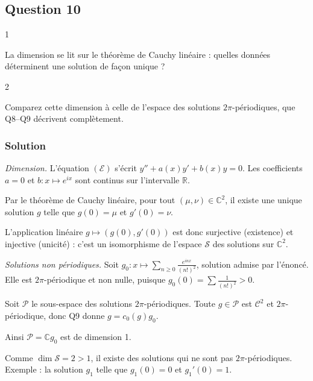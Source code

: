 \documentclass[11pt,a4paper]{article}
\newcommand{\equationajustee}[1]{%
  \sbox{\boiteequation}{$\displaystyle #1$}%
  \ifdim\wd\boiteequation>\linewidth
    \[\resizebox{\linewidth}{!}{\usebox{\boiteequation}}\]%
  \else
    \[#1\]%
  \fi}
\begin{document}
\hypertarget{question-10}{%
\subsection{Question 10}\label{question-10}}

\begin{indication}{1}

La dimension se lit sur le théorème de Cauchy linéaire : quelles données déterminent une solution de façon unique ?

\end{indication}

\begin{indication}{2}

Comparez cette dimension à celle de l'espace des solutions \(2\pi\)-périodiques, que Q8--Q9 décrivent complètement.

\end{indication}

\hypertarget{solution-9}{%
\subsubsection{Solution}\label{solution-9}}

\emph{Dimension.} L'équation \((\mathcal E)\) s'écrit \(y''+a(x)y'+b(x)y=0\). Les coefficients \(a=0\) et \(b:x\mapsto e^{ix}\) sont continus sur l'intervalle \(\mathbb R\).

Par le théorème de Cauchy linéaire, pour tout \((\mu,\nu)\in\mathbb C^2\), il existe une unique solution \(g\) telle que \(g(0)=\mu\) et \(g'(0)=\nu\).

L'application linéaire \(g\mapsto(g(0),g'(0))\) est donc surjective (existence) et injective (unicité) : c'est un isomorphisme de l'espace \(\mathcal S\) des solutions sur \(\mathbb C^2\).
\equationajustee{\boxed{\dim_{\mathbb C}\mathcal S=2.}}

\emph{Solutions non périodiques.} Soit \(g_0:x\mapsto\sum_{n\geqslant0}\frac{e^{inx}}{(n!)^2}\), solution admise par l'énoncé. Elle est \(2\pi\)-périodique et non nulle, puisque \(g_0(0)=\sum\frac1{(n!)^2}>0\).

Soit \(\mathcal P\) le sous-espace des solutions \(2\pi\)-périodiques. Toute \(g\in\mathcal P\) est \(\mathcal C^2\) et \(2\pi\)-périodique, donc Q9 donne \(g=c_0(g)g_0\).

Ainsi \(\mathcal P=\mathbb Cg_0\) est de dimension 1.

Comme \(\dim\mathcal S=2>1\), il existe des solutions qui ne sont pas \(2\pi\)-périodiques. Exemple : la solution \(g_1\) telle que \(g_1(0)=0\) et \(g_1'(0)=1\).
\end{document}
